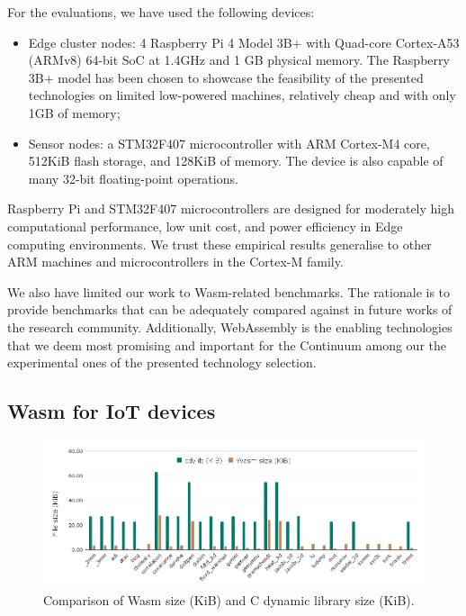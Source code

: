 For the evaluations, we have used the following devices:

\begin{itemize}
    \item Edge cluster nodes: 4 Raspberry Pi 4 Model 3B+ with Quad-core Cortex-A53 (ARMv8) 64-bit SoC at 1.4GHz and 1 GB physical memory. The Raspberry 3B+ model has been chosen to showcase the feasibility of the presented technologies on limited low-powered machines, relatively cheap and with only 1GB of memory;
    \item Sensor nodes: a STM32F407 microcontroller with ARM Cortex-M4 core, 512KiB flash storage, and 128KiB of memory. The device is also capable of many 32-bit floating-point operations.
\end{itemize}

Raspberry Pi and STM32F407 microcontrollers are designed for moderately high computational performance, low unit cost, and power efficiency in Edge computing environments. We trust these empirical results generalise to other ARM machines and microcontrollers in the Cortex-M family.

We also have limited our work to Wasm-related benchmarks. The rationale is to provide benchmarks that can be adequately compared against in future works of the research community. Additionally, WebAssembly is the enabling technologies that we deem most promising and important for the Continuum among our the experimental ones of the presented technology selection.

\subsection{Wasm for IoT devices}

\begin{figure}[ht]
\centering
\includegraphics[width=\columnwidth]{figures/b-wasmi-3}
\caption{Comparison of Wasm size (KiB) and C dynamic library size (KiB).} \label{fig:b-wasmi-3}
\end{figure}

